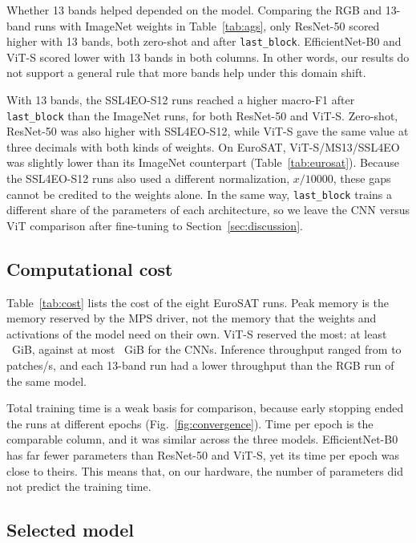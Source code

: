 Whether 13 bands helped depended on the model. Comparing the RGB and 13-band runs with ImageNet
weights in Table~\ref{tab:ags}, only ResNet-50 scored higher with 13 bands, both zero-shot and
after \texttt{last\_block}. EfficientNet-B0 and ViT-S scored lower with 13 bands in both
columns. In other words, our results do not support a general rule that more bands help under
this domain shift.

With 13 bands, the SSL4EO-S12 runs reached a higher macro-F1 after \texttt{last\_block} than
the ImageNet runs, for both ResNet-50 and ViT-S. Zero-shot, ResNet-50 was also higher with
SSL4EO-S12, while ViT-S gave the same value at three decimals with both kinds of weights. On
EuroSAT, ViT-S/MS13/SSL4EO was slightly lower than its ImageNet counterpart
(Table~\ref{tab:eurosat}). Because the SSL4EO-S12 runs also used a different normalization,
$x/\num{10000}$, these gaps cannot be credited to the weights alone. In the same way,
\texttt{last\_block} trains a different share of the parameters of each architecture, so we
leave the CNN versus ViT comparison after fine-tuning to Section~\ref{sec:discussion}.

\subsection{Computational cost}

Table~\ref{tab:cost} lists the cost of the eight EuroSAT runs. Peak memory is the memory
reserved by the MPS driver, not the memory that the weights and activations of the model need
on their own. ViT-S reserved the most: at least \PeakMemVitMin~GiB, against at most
\PeakMemCnnMax~GiB for the CNNs. Inference throughput ranged from \PatchesPerSecMin{} to
\PatchesPerSecMax{} patches/s, and each 13-band run had a lower throughput than the RGB run of
the same model.



Total training time is a weak basis for comparison, because early stopping ended the runs at
different epochs (Fig.~\ref{fig:convergence}). Time per epoch is the comparable column, and it
was similar across the three models. EfficientNet-B0 has far fewer parameters than ResNet-50 and
ViT-S, yet its time per epoch was close to theirs. This means that, on our hardware, the number
of parameters did not predict the training time.

\subsection{Selected model}\label{sec:selected}

